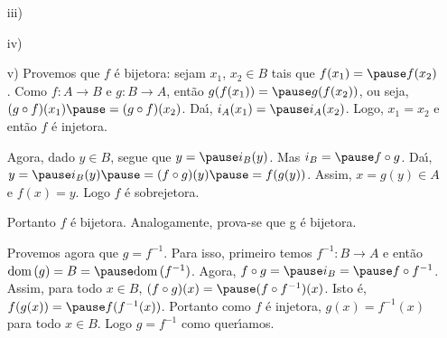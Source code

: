 \documentclass{beamer}
\begin{document}
    \begin{frame}
        \begin{enumerate}
            \item[iii)]\phantom{nada}\\

            \vspace{3.5cm}

            \item[iv)]
        \end{enumerate}
        \vspace{3.5cm}
    \end{frame}

    \begin{frame}
        \begin{enumerate}
            \item[v)] Provemos que $f$ \'e bijetora: \pause sejam $x_1$, \pause $x_2 \in B$ \pause tais que $f(x_1) = \pause f(x_2)$. \pause Como $f : A \to B$ \pause e $g : B \to A$, \pause ent{\~a}o $g(f(x_1)) = \pause g(f(x_2))$, \pause ou seja, \pause $(g\circ f)(x_1) \pause = (g\circ f)(x_2)$. \pause Da{\'\i}, $i_{A}(x_1) = \pause i_{A}(x_2)$. \pause Logo, \pause $x_1 = x_2$ \pause \linebreak e ent\~ao $f$ {\'e} injetora.\pause

            \vspace{.3cm}

            Agora, dado $y \in B$, \pause segue que $y = \pause i_{B}(y)$. \pause Mas $i_{B} = \pause f\circ g$. \pause Da{\'\i}, \pause $y = \pause i_{B}(y) \pause = (f\circ g)(y) \pause = f(g(y))$. \pause Assim, \pause $x = g(y) \in A$ \pause e $f(x) = y$. \pause Logo $f$ {\'e} sobrejetora.\pause

            \vspace{.3cm}

            Portanto $f$ {\'e} bijetora. \pause Analogamente, prova-se que g {\'e} bijetora.\pause

            \vspace{.3cm}

            Provemos agora que \pause $g = f^{-1}$. \pause Para isso, \pause primeiro temos \linebreak $f^{-1} : B \to A$ \pause e ent\~ao $\dom(g) = B = \pause \dom(f^{-1})$. \pause Agora, $f\circ g = \pause i_{B} = \pause f\circ f^{-1}$. \pause Assim, para todo $x \in B$, \pause $(f\circ g)(x) = \pause (f\circ f^{-1})(x)$. \pause Isto {\'e}, \pause $f(g(x)) = \pause f(f^{-1}(x))$. \pause Portanto como $f$ \'e injetora, \pause $g(x) = f^{-1}(x)$ \pause para todo $x \in B$. \pause Logo $g = f^{-1}$ \pause como quer{\'\i}amos.\pause \hspace{.5cm} \qedsymbol
        \end{enumerate}
    \end{frame}
\end{document}
